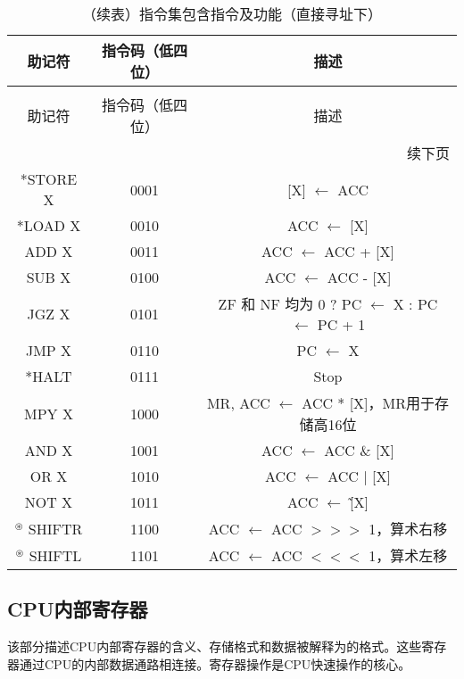 \documentclass[lang=cn,a4paper,newtx]{elegantpaper}
\begin{document}
\begin{longtable}{c c c}
  \caption{指令集包含指令及功能（直接寻址下）} \label{tab:ISA:instructions} \\
  \toprule
  助记符  & 指令码（低四位） & 描述 \\
  \midrule
  \endfirsthead
  
  \caption[]{（续表）指令集包含指令及功能（直接寻址下）} \\
  \toprule
  助记符  & 指令码（低四位） & 描述 \\
  \midrule
  \endhead
  
  \midrule
  \multicolumn{3}{r}{续下页} \\
  \midrule
  \endfoot
  
  \bottomrule
  \endlastfoot
  
  *STORE X &  0001   & [X] $\leftarrow$ ACC  \\
  *LOAD X  & 0010    & ACC $\leftarrow$ [X]  \\
  ADD X   & 0011    & ACC $\leftarrow$ ACC + [X]\\
  SUB X   & 0100  & ACC $\leftarrow$ ACC - [X]\\
  JGZ X   & 0101    & ZF 和 NF 均为 0   ? PC $\leftarrow$ X : PC $\leftarrow$ PC + 1\\
  JMP X   & 0110    & PC $\leftarrow$ X\\
  *HALT    & 0111    & Stop\\
  MPY X   & 1000    & MR, ACC $\leftarrow$ ACC * [X]，MR用于存储高16位 \\
  AND X   & 1001    & ACC $\leftarrow$ ACC \& [X]\\
  OR X    & 1010    & ACC $\leftarrow$ ACC | [X]\\
  NOT X   & 1011    & ACC $\leftarrow$ \~[X] \\
  $^\circledast$ SHIFTR  & 1100    & ACC $\leftarrow$ ACC $>>>$ 1，算术右移\\
  $^\circledast$ SHIFTL  & 1101    & ACC $\leftarrow$ ACC $<<<$ 1，算术左移\\
\end{longtable}

\subsection{CPU内部寄存器}
该部分描述CPU内部寄存器的含义、存储格式和数据被解释为的格式。这些寄存器通过CPU的内部数据通路相连接。寄存器操作是CPU快速操作的核心。
\end{document}
